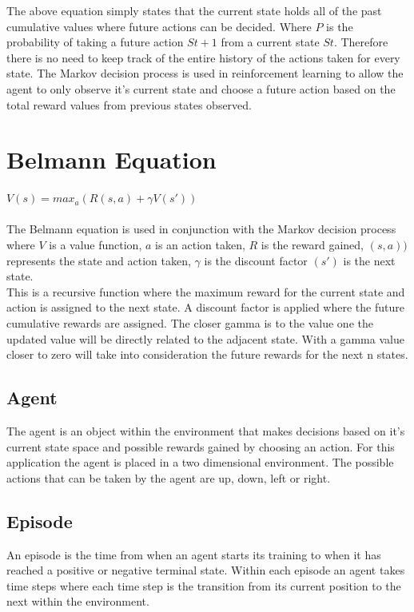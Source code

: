 The above equation simply states that the current state holds all of the past cumulative values where future actions can be decided.
Where $P$ is the probability of taking a future action $St+1$  from a current state $St$. Therefore there is no need to keep track of the entire history of the actions taken for every state. The Markov decision process is used in reinforcement learning to allow the agent to only observe it's current state and choose a future action based on the total reward values from previous states observed.

\section{Belmann Equation}
$V(s) = max_{a}(R(s,a)+\gamma V(s'))$\\\\

The Belmann equation is used in conjunction with the Markov decision process where $V$ is a value function, $a$ is an action taken, $R$ is the reward gained, $(s,a))$ represents the state and action taken, $\gamma$ is the discount factor $(s')$ is the next state.
\\

This is a recursive function where the maximum reward for the current state and action is assigned to the next state. A discount factor is applied where the future cumulative rewards are assigned. The closer gamma is to the value one the updated value will be directly related to the adjacent state. With a gamma value closer to zero will take into consideration the future rewards for the next n states.
\subsection{Agent}
The agent is an object within the environment that makes decisions based on it's current state space and possible rewards gained by choosing an action. For this application the agent is placed in a two dimensional environment. The possible actions that can be taken by the agent are up, down, left or right.\\
\subsection{Episode}
An episode is the time from when an agent starts its training to when it has reached a positive or negative terminal state. Within each episode an agent takes time steps where each time step is the transition from its current position to the next within the environment.

